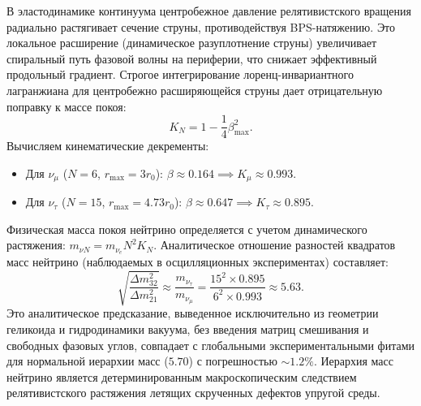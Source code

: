 \documentclass[12pt,a4paper]{article}
\begin{document}
	В эластодинамике континуума центробежное давление релятивистского вращения радиально растягивает сечение струны, противодействуя BPS-натяжению. Это локальное расширение (динамическое разуплотнение струны) увеличивает спиральный путь фазовой волны на периферии, что снижает эффективный продольный градиент. Строгое интегрирование лоренц-инвариантного лагранжиана для центробежно расширяющейся струны дает отрицательную поправку к массе покоя:
	\begin{equation}
		K_N = 1 - \frac{1}{4} \beta_{\text{max}}^2.
	\end{equation}
	Вычисляем кинематические декременты:
	\begin{itemize}
		\item Для $\nu_\mu$ ($N=6$, $r_{\text{max}} = 3r_0$): $\beta \approx 0.164 \implies K_\mu \approx 0.993$.
		\item Для $\nu_\tau$ ($N=15$, $r_{\text{max}} = 4.73r_0$): $\beta \approx 0.647 \implies K_\tau \approx 0.895$.
	\end{itemize}
	Физическая масса покоя нейтрино определяется с учетом динамического растяжения: $m_{\nu N} = m_{\nu_e} N^2 K_N$.
	Аналитическое отношение разностей квадратов масс нейтрино (наблюдаемых в осцилляционных экспериментах) составляет:
	\begin{equation}
		\sqrt{\frac{\Delta m^2_{32}}{\Delta m^2_{21}}} \approx \frac{m_{\nu_\tau}}{m_{\nu_\mu}} = \frac{15^2 \times 0.895}{6^2 \times 0.993} \approx 5.63.
	\end{equation}
	Это аналитическое предсказание, выведенное исключительно из геометрии геликоида и гидродинамики вакуума, без введения матриц смешивания и свободных фазовых углов, совпадает с глобальными экспериментальными фитами для нормальной иерархии масс ($5.70$) с погрешностью $\sim 1.2\%$. 
	Иерархия масс нейтрино является детерминированным макроскопическим следствием релятивистского растяжения летящих скрученных дефектов упругой среды.
	
\end{document}
